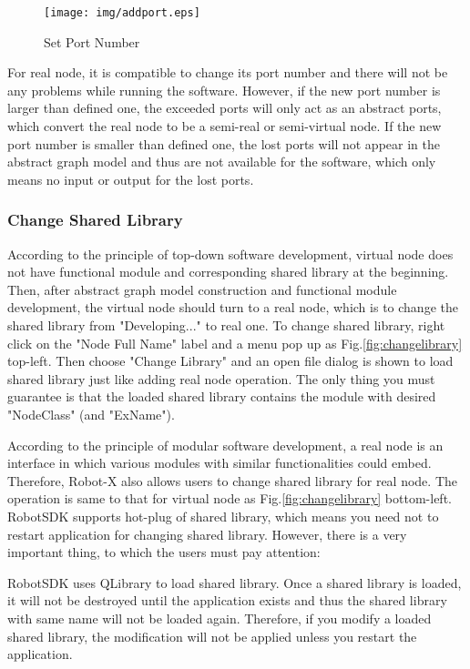 \documentclass[a4paper,10pt]{book}
\begin{document}
\begin{figure}
 \centering
 \texttt{[image: img/addport.eps]}
 \caption{Set Port Number}
 \label{fig:addport}
\end{figure}

For real node, it is compatible to change its port number and there will not be any problems while running the software. However, if the new port number is larger than defined one, the exceeded ports will only act as an abstract ports, which convert the real node to be a semi-real or semi-virtual node. If the new port number is smaller than defined one, the lost ports will not appear in the abstract graph model and thus are not available for the software, which only means no input or output for the lost ports. 

\subsubsection{Change Shared Library}

According to the principle of top-down software development, virtual node does not have functional module and corresponding shared library at the beginning. Then, after abstract graph model construction and functional module development, the virtual node should turn to a real node, which is to change the shared library from "Developing..." to real one. To change shared library, right click on the "Node Full Name" label and a menu pop up as Fig.\ref{fig:changelibrary} top-left. Then choose "Change Library" and an open file dialog is shown to load shared library just like adding real node operation. The only thing you must guarantee is that the loaded shared library contains the module with desired "NodeClass" (and "ExName").

According to the principle of modular software development, a real node is an interface in which various modules with similar functionalities could embed. Therefore, Robot-X also allows users to change shared library for real node. The operation is same to that for virtual node as Fig.\ref{fig:changelibrary} bottom-left. RobotSDK supports hot-plug of shared library, which means you need not to restart application for changing shared library. However, there is a very important thing, to which the users must pay attention:

\begin{framed}
RobotSDK uses QLibrary to load shared library. Once a shared library is loaded, it will not be destroyed until the application exists and thus the shared library with same name will not be loaded again. Therefore, if you modify a loaded shared library, the modification will not be applied unless you restart the application. 
\end{framed}
\end{document}
